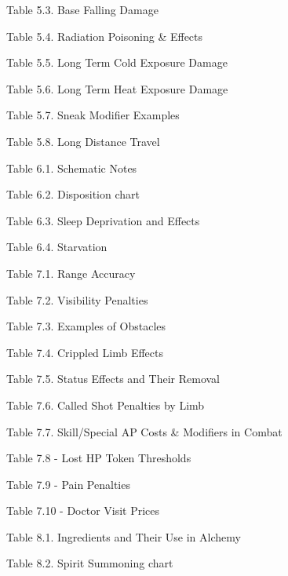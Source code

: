 \documentclass[11pt,a4paper,twocolumn]{book}
\begin{document}
    Table 5.3. Base Falling Damage

    Table 5.4. Radiation Poisoning \& Effects

    Table 5.5. Long Term Cold Exposure Damage

    Table 5.6. Long Term Heat Exposure Damage
 
    Table 5.7. Sneak Modifier Examples

    Table 5.8. Long Distance Travel

    Table 6.1. Schematic Notes

    Table 6.2. Disposition chart

    Table 6.3. Sleep Deprivation and Effects

    Table 6.4. Starvation

    Table 7.1. Range Accuracy

    Table 7.2. Visibility Penalties

    Table 7.3. Examples of Obstacles

    Table 7.4. Crippled Limb Effects

    Table 7.5. Status Effects and Their Removal

    Table 7.6. Called Shot Penalties by Limb

    Table 7.7. Skill/Special AP Costs \& Modifiers in Combat

    Table 7.8 - Lost HP Token Thresholds

    Table 7.9 - Pain Penalties

    Table 7.10 - Doctor Visit Prices

    Table 8.1. Ingredients and Their Use in Alchemy

    Table 8.2. Spirit Summoning chart
\end{document}
